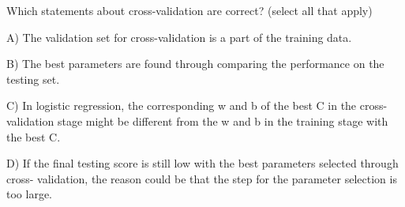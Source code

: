 Which statements about cross-validation are correct? (select all that apply)


A) The validation set for cross-validation is a part of the training data.


B) The best parameters are found through comparing the performance on the testing set.


C) In logistic regression, the corresponding w and b of the best C in the cross-validation stage might be different from the w and b in the training stage with the best C.


D) If the final testing score is still low with the best parameters selected through cross- validation, the reason could be that the step for the parameter selection is too large.

